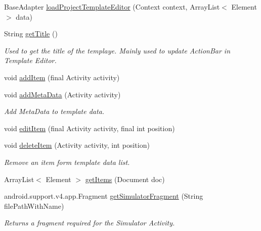 \begin{DoxyCompactItemize}
\item 
Base\+Adapter \hyperlink{classorg_1_1buildmlearn_1_1toolkit_1_1templates_1_1DictationTemplate_afb57f4aed6bb0f529702a30adb0378fe}{load\+Project\+Template\+Editor} (Context context, Array\+List$<$ Element $>$ data)
\item 
String \hyperlink{classorg_1_1buildmlearn_1_1toolkit_1_1templates_1_1DictationTemplate_af140a99f34e94aacc6926f91355d57e4}{get\+Title} ()
\begin{DoxyCompactList}\small\item\em Used to get the title of the templaye. Mainly used to update Action\+Bar in Template Editor. \end{DoxyCompactList}\item 
void \hyperlink{classorg_1_1buildmlearn_1_1toolkit_1_1templates_1_1DictationTemplate_a156a9b01a66d5ce1e08426c6544e5dfd}{add\+Item} (final Activity activity)
\item 
void \hyperlink{classorg_1_1buildmlearn_1_1toolkit_1_1templates_1_1DictationTemplate_a9605db1565bfbb95cbee4d768d10b011}{add\+Meta\+Data} (Activity activity)
\begin{DoxyCompactList}\small\item\em Add Meta\+Data to template data. \end{DoxyCompactList}\item 
void \hyperlink{classorg_1_1buildmlearn_1_1toolkit_1_1templates_1_1DictationTemplate_a0262e857065565502482cb9305ae3b77}{edit\+Item} (final Activity activity, final int position)
\item 
void \hyperlink{classorg_1_1buildmlearn_1_1toolkit_1_1templates_1_1DictationTemplate_a3f1c0098fb096ca7e56e52bfe2122ff0}{delete\+Item} (Activity activity, int position)
\begin{DoxyCompactList}\small\item\em Remove an item form template data list. \end{DoxyCompactList}\item 
Array\+List$<$ Element $>$ \hyperlink{classorg_1_1buildmlearn_1_1toolkit_1_1templates_1_1DictationTemplate_ac19b648066d29711eb5c35b0bd076eed}{get\+Items} (Document doc)
\item 
android.\+support.\+v4.\+app.\+Fragment \hyperlink{classorg_1_1buildmlearn_1_1toolkit_1_1templates_1_1DictationTemplate_a0728ddad8247b6b56e10b236879f53b1}{get\+Simulator\+Fragment} (String file\+Path\+With\+Name)
\begin{DoxyCompactList}\small\item\em Returns a fragment required for the Simulator Activity. \end{DoxyCompactList}\item 

\end{DoxyCompactItemize}
